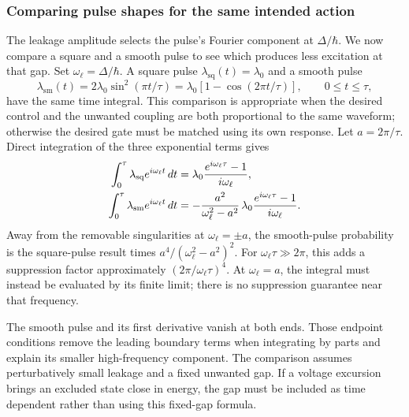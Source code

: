 \subsubsection{Comparing pulse shapes for the same intended action}
The leakage amplitude selects the pulse's Fourier component at
$\Delta/\hbar$. We now compare a square and a smooth pulse to see
which produces less excitation at that gap. Set $\omega_\ell=\Delta/\hbar$. A square pulse
$\lambda_{\mathrm{sq}}(t)=\lambda_0$ and a smooth pulse
\[
 \lambda_{\mathrm{sm}}(t)=
   2\lambda_0\sin^2(\pi t/\tau)
   =\lambda_0[1-\cos(2\pi t/\tau)],\qquad 0\le t\le\tau,
\]
have the same time integral. This comparison is appropriate when
the desired control and the unwanted coupling are both
proportional to the same waveform; otherwise the desired gate
must be matched using its own response.
Let $a=2\pi/\tau$. Direct integration of the three exponential
terms gives
\begin{align}
 \int_0^\tau\lambda_{\mathrm{sq}}e^{i\omega_\ell t}\,dt
   &=\lambda_0\frac{e^{i\omega_\ell\tau}-1}{i\omega_\ell},
       \notag\\
 \int_0^\tau\lambda_{\mathrm{sm}}e^{i\omega_\ell t}\,dt
   &=-\frac{a^2}{\omega_\ell^2-a^2}\,
       \lambda_0\frac{e^{i\omega_\ell\tau}-1}{i\omega_\ell}.
 \label{eq:calibration-smooth-pulse-spectrum}
\end{align}
Away from the removable singularities at $\omega_\ell=\pm a$,
the smooth-pulse probability is the square-pulse result times
$a^4/(\omega_\ell^2-a^2)^2$. For $\omega_\ell\tau\gg2\pi$,
this adds a suppression factor approximately
$(2\pi/\omega_\ell\tau)^4$. At $\omega_\ell=a$, the integral
must instead be evaluated by its finite limit; there is no
suppression guarantee near that frequency.

The smooth pulse and its first derivative vanish at both ends.
Those endpoint conditions remove the leading boundary terms
when integrating by parts and explain its smaller high-frequency
component. The comparison assumes perturbatively small leakage
and a fixed unwanted gap. If a voltage excursion brings an
excluded state close in energy, the gap must be included as
time dependent rather than using this fixed-gap formula.

